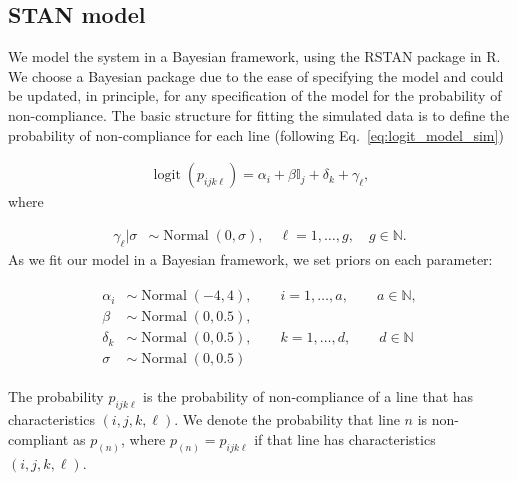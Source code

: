 \documentclass[aoas]{imsart}
\DeclareMathOperator{\logit}{logit}
\DeclareMathOperator{\Normal}{Normal}
\begin{document}
\subsection{STAN model}
We model the system in a Bayesian framework, using the RSTAN package in R. We choose a Bayesian package due to the ease of specifying the model and could be updated, in principle, for any specification of the model for the probability of non-compliance. The basic structure for fitting the simulated data is to define the probability of non-compliance for each line (following Eq.~\eqref{eq:logit_model_sim})

\begin{align}
\logit(p_{ijk\ell}) = \alpha_{i} + \beta\mathbb{I}_j + \delta_k + \gamma_\ell, \label{eq:logit_model_fit_sim}
\end{align}
where 

\begin{align}
\gamma_\ell | \sigma &\sim \Normal(0, \sigma), \quad  \ell = 1,\ldots, g, \quad  g \in \mathbb{N}.
\end{align}
As we fit our model in a Bayesian framework, we set priors on each parameter:

\begin{align}
\begin{split}
\alpha_i &\sim \Normal(-4, 4), \quad \quad i=1, \ldots, a,\quad \quad  a\in \mathbb{N},\\
\beta &\sim \Normal(0, 0.5),\\
\delta_k &\sim \Normal(0, 0.5),\quad \quad  k = 1,\ldots, d, \quad \quad d \in \mathbb{N}\\
\sigma &\sim \Normal(0, 0.5)
\end{split}
\end{align}

The probability $p_{ijk\ell}$ is the probability of non-compliance of a line that has characteristics $(i,j,k,\ell)$. We denote the probability that line $n$ is non-compliant as $p_{(n)}$, where $p_{(n)} = p_{ijk\ell}$ if that line has characteristics $(i,j,k,\ell)$.
\end{document}

